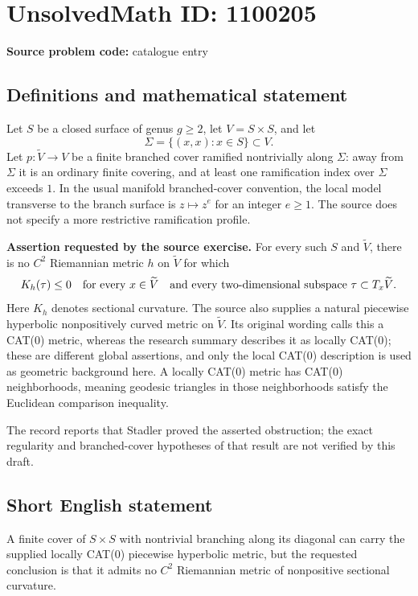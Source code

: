\documentclass[11pt]{article}
\begin{document}
\section*{UnsolvedMath ID: 1100205}
\textbf{Source problem code:} catalogue entry
\subsection{Definitions and mathematical statement}
Let $S$ be a closed surface of genus $g\geq2$, let $V=S\times S$, and let
\[
\Sigma=\{(x,x):x\in S\}\subset V.
\]
Let $p:\widetilde V\to V$ be a finite branched cover ramified nontrivially along $\Sigma$: away from $\Sigma$ it is an ordinary finite covering, and at least one ramification index over $\Sigma$ exceeds $1$. In the usual manifold branched-cover convention, the local model transverse to the branch surface is $z\mapsto z^e$ for an integer $e\geq1$. The source does not specify a more restrictive ramification profile.

\textbf{Assertion requested by the source exercise.} For every such $S$ and $\widetilde V$, there is no $C^2$ Riemannian metric $h$ on $\widetilde V$ for which
\[
K_h(\tau)\leq0\quad\hbox{for every }x\in\widetilde V
\quad\hbox{and every two-dimensional subspace }\tau\subset T_x\widetilde V.
\]
Here $K_h$ denotes sectional curvature. The source also supplies a natural piecewise hyperbolic nonpositively curved metric on $\widetilde V$. Its original wording calls this a CAT(0) metric, whereas the research summary describes it as locally CAT(0); these are different global assertions, and only the local CAT(0) description is used as geometric background here. A locally CAT(0) metric has CAT(0) neighborhoods, meaning geodesic triangles in those neighborhoods satisfy the Euclidean comparison inequality.

The record reports that Stadler proved the asserted obstruction; the exact regularity and branched-cover hypotheses of that result are not verified by this draft.
\subsection{Short English statement}
A finite cover of $S\times S$ with nontrivial branching along its diagonal can carry the supplied locally CAT(0) piecewise hyperbolic metric, but the requested conclusion is that it admits no $C^2$ Riemannian metric of nonpositive sectional curvature.
\end{document}

